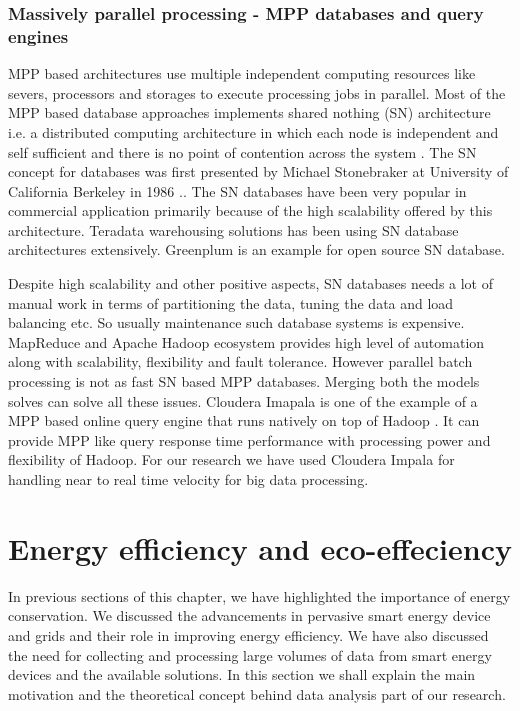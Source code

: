 \subsubsection{Massively parallel processing - MPP databases and query engines}
MPP based architectures use multiple independent computing resources like severs, processors and storages to execute processing jobs in parallel. Most of the MPP based database approaches implements shared nothing (SN) architecture i.e. a distributed computing architecture in which each node is independent and self sufficient and there is no point of contention across the system \cite{wikisn}. The SN concept for databases was first presented by Michael Stonebraker at University of California Berkeley in 1986 \cite{stonebraker1986case}.. The SN databases have been very popular in commercial application primarily because of the high scalability offered by this architecture. Teradata warehousing solutions has been using SN database architectures extensively. Greenplum is an example for open source SN database.

Despite high scalability and other positive aspects, SN databases needs a lot of manual work in terms of partitioning the data, tuning the data and load balancing etc. So usually maintenance such database systems is expensive. MapReduce and Apache Hadoop ecosystem provides high level of automation along with scalability, flexibility and fault tolerance. However parallel batch processing is not as fast SN based MPP databases. Merging both the models solves can solve all these issues. Cloudera Imapala is one of the example of a MPP based online query engine that runs natively on top of Hadoop \cite{ clouderaimpala}. It can provide MPP like query response time performance with processing power and flexibility of Hadoop. For our research we have used Cloudera Impala for handling near to real time velocity for big data processing.

\section{Energy efficiency and eco-effeciency}
In previous sections of this chapter, we have highlighted the importance of energy conservation. We discussed the advancements in pervasive smart energy device and grids and their role in improving energy efficiency.  We have also discussed the need for collecting and processing large volumes of data from smart energy devices and the available solutions. In this section we shall explain the main motivation and the theoretical concept behind data analysis part of our research.  

